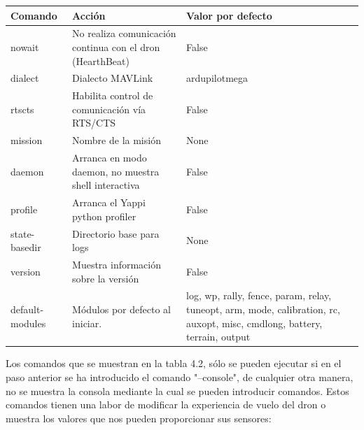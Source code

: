 \begin{center}
  \label{tab:scriptArranqueComandos2}
  \begin{tabular}{ | l | p{8cm} | p{5cm} |}
  \hline
    \textbf{Comando} & \textbf{Acción} & \textbf{Valor por defecto} \\ \hline
    nowait&No realiza comunicación continua con el dron (HearthBeat) &  False\\ \hline
    dialect & Dialecto MAVLink& ardupilotmega \\ \hline
    rtscts& Habilita control de comunicación vía RTS/CTS&  False\\ \hline
    mission& Nombre de la misión& None \\ \hline
    daemon & Arranca en modo daemon, no muestra shell interactiva & False \\ \hline
    profile& Arranca el Yappi python profiler& False \\ \hline
    state-basedir& Directorio base para logs& None \\ \hline
    version& Muestra información sobre la versión& False \\ \hline
    default-modules& Módulos por defecto al iniciar.& log, wp, rally, fence, param, relay, tuneopt, arm, mode, calibration, rc, auxopt, misc, cmdlong, battery, terrain, output \\ \hline
  \end{tabular}
\end{center}

Los comandos que se muestran en la tabla 4.2, sólo se pueden ejecutar si en el paso anterior se ha introducido el comando "--console", de cualquier otra manera, no se muestra la consola mediante la cual se pueden introducir comandos. Estos comandos tienen una labor de modificar la experiencia de vuelo del dron o muestra los valores que nos pueden proporcionar sus sensores:

